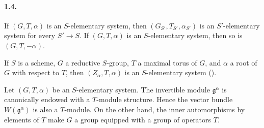 \paragraph{\textbf{1.4.}}
If \((G,T,\alpha)\) is an \(S\)-elementary system, then
\((G_{S'},T_{S'},\alpha_{S'})\) is an \(S'\)-elementary system for
every \(S'\to S\). If \((G,T,\alpha)\) is an \(S\)-elementary
system, then so is \((G,T,-\alpha)\).

If \(S\) is a scheme, \(G\) a reductive \(S\)-group, \(T\) a
maximal torus of \(G\), and \(\alpha\) a root of \(G\) with respect
to \(T\), then \((Z_\alpha,T,\alpha)\) is an \(S\)-elementary
system \textup{()}.

Let \((G,T,\alpha)\) be an \(S\)-elementary system. The invertible
module \(\mathfrak g^\alpha\) is canonically endowed with a
\(T\)-module structure. Hence the vector bundle
\(W(\mathfrak g^\alpha)\) is also a \(T\)-module. On the other hand,
the inner automorphisms by elements of \(T\) make \(G\) a group
equipped with a group of operators \(T\).
